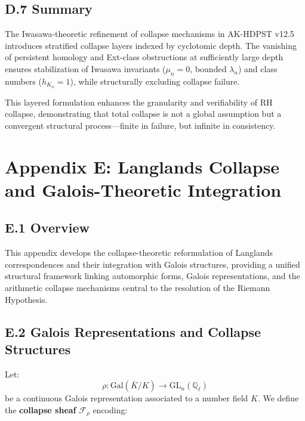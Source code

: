 \documentclass[11pt]{article}
\begin{document}
\subsection*{D.7 Summary}

The Iwasawa-theoretic refinement of collapse mechanisms in AK-HDPST v12.5 introduces stratified collapse layers indexed by cyclotomic depth. The vanishing of persistent homology and Ext-class obstructions at sufficiently large depth ensures stabilization of Iwasawa invariants ($\mu_n = 0$, bounded $\lambda_n$) and class numbers ($h_{K_n} = 1$), while structurally excluding collapse failure.

This layered formulation enhances the granularity and verifiability of RH collapse, demonstrating that total collapse is not a global assumption but a convergent structural process—finite in failure, but infinite in consistency.



\section*{Appendix E: Langlands Collapse and Galois-Theoretic Integration}

\subsection*{E.1 Overview}

This appendix develops the collapse-theoretic reformulation of Langlands correspondences and their integration with Galois structures, providing a unified structural framework linking automorphic forms, Galois representations, and the arithmetic collapse mechanisms central to the resolution of the Riemann Hypothesis.

\subsection*{E.2 Galois Representations and Collapse Structures}

Let:
\[
\rho : \mathrm{Gal}(\overline{K}/K) \longrightarrow \mathrm{GL}_n(\mathbb{Q}_\ell)
\]
be a continuous Galois representation associated to a number field $K$. We define the \textbf{collapse sheaf} $\mathcal{F}_\rho$ encoding:
\end{document}
